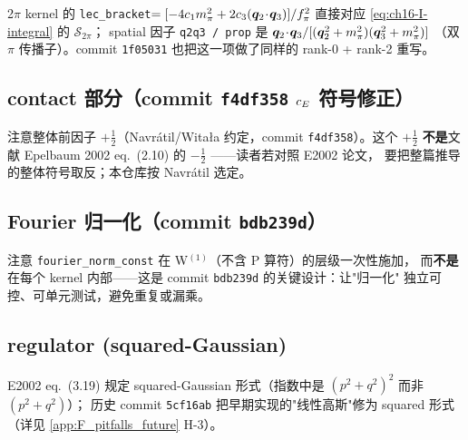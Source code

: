 2\(\pi\) kernel 的 \texttt{lec\_bracket}\(=[-4c_1m_\pi^2 + 2c_3(\bm{q}_2\!\cdot\!\bm{q}_3)]/f_\pi^2\) 直接对应 \cref{eq:ch16-I-integral} 的 \(\mathcal{S}_{2\pi}\)；
spatial 因子 \texttt{q2q3 / prop} 是 \(\bm{q}_2\!\cdot\!\bm{q}_3 / [(\bm{q}_2^2+m_\pi^2)(\bm{q}_3^2+m_\pi^2)]\)
（双 \(\pi\) 传播子）。commit \texttt{1f05031} 也把这一项做了同样的 rank-0 + rank-2 重写。

\subsection{contact 部分（commit \texttt{f4df358} \(c_E\) 符号修正）}



注意整体前因子 \(+\tfrac12\)（Navrátil/Witała 约定，commit \texttt{f4df358}）。这个 \(+\tfrac12\)
\textbf{不是}文献 Epelbaum 2002 eq.~(2.10) 的 \(-\tfrac12\) ——读者若对照 E2002 论文，
要把整篇推导的整体符号取反；本仓库按 Navrátil 选定。

\subsection{Fourier 归一化（commit \texttt{bdb239d}）}



注意 \texttt{fourier\_norm\_const} 在 W\(^{(1)}\)（不含 P 算符）的层级一次性施加，
而\textbf{不是}在每个 kernel 内部——这是 commit \texttt{bdb239d} 的关键设计：让"归一化"
独立可控、可单元测试，避免重复或漏乘。

\subsection{regulator (squared-Gaussian)}



E2002 eq.~(3.19) 规定 squared-Gaussian 形式（指数中是 \((p^2+q^2)^2\) 而非 \((p^2+q^2)\)）；
历史 commit \texttt{5cf16ab} 把早期实现的"线性高斯"修为 squared 形式（详见 \cref{app:F_pitfalls_future} H-3）。


